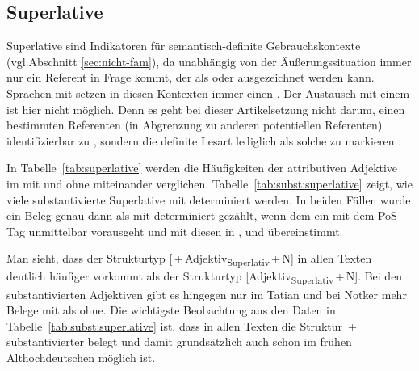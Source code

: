 \subsection{Superlative}\label{sec:ergeb-superaltiv}

Superlative  sind Indikatoren für semantisch-definite  Gebrauchskontexte  (vgl.\linebreak Abschnitt \ref{sec:nicht-fam}), da unabhängig von der Äußerungssituation  immer nur ein Referent in Frage kommt, der als  oder  ausgezeichnet werden kann. Sprachen mit  setzen in diesen Kontexten immer einen  \parencite{Himmelmann2001}. Der Austausch mit einem  ist hier nicht möglich. Denn es geht bei dieser Artikelsetzung nicht darum, einen bestimmten Referenten (in Abgrenzung zu anderen potentiellen Referenten) identifizierbar zu , sondern die definite Lesart lediglich als solche zu markieren \parencite[41]{Himmelmann1997}.

In Tabelle~\ref{tab:superlative} werden die Häufigkeiten der attributiven Adjektive  im  mit und ohne  miteinander verglichen. Tabelle~\ref{tab:subst:superlative} zeigt, wie viele substantivierte  Superlative  mit  determiniert werden. In beiden Fällen wurde ein Beleg genau dann als mit  determiniert gezählt, wenn dem  ein  mit dem PoS-Tag  unmittelbar vorausgeht und mit diesen in ,  und  übereinstimmt. 

Man sieht, dass der Strukturtyp    [\,+\,Adjektiv\textsubscript{Superlativ}\,+\,N] in allen Texten deutlich häufiger vorkommt als der Strukturtyp [Adjektiv\textsubscript{Superlativ}\,+\,N]. Bei den substantivierten Adjektiven   gibt es hingegen nur im Tatian und bei Notker mehr Belege mit  als ohne. Die wichtigste Beobachtung aus den Daten in Tabelle~\ref{tab:subst:superlative} ist, dass in allen Texten die Struktur \,+\,substantivierter   belegt und damit grundsätzlich auch schon im frühen Althochdeutschen möglich ist. 

 
